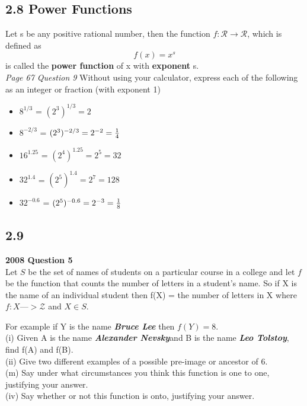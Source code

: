 \documentclass[12 pt]{article}
\begin{document}
\newpage
\subsection*{2.8 Power Functions}
Let s be any positive rational number, then the function $f: \mathcal{R} \rightarrow \mathcal{R}$, which is defined
as \[ f(x) = x^s\] is called the \textbf{power function} of x with \textbf{exponent} s.\\

\bigskip 
\noindent \emph{Page 67 Question 9}
Without using your calculator, express each of the following as an integer or fraction (with exponent 1)
\begin{itemize}
\item $8^{1/3}$ = $(2^3)^{1/3} = 2$
\item $8^{-2/3}$ = $(2^3)^{-2/3} = 2^{-2} = {1 \over 4}$
\item $16^{1.25}$ = $(2^4)^{1.25}  = 2^5 = 32$ 
\item $32^{1.4}$ = $(2^5)^{1.4} = 2^7 = 128$
\item $32^{-0.6}$ = $(2^5)^{-0.6} = 2^{-3} =  {1 \over 8}$
\end{itemize}
\subsection{2.9}
\textbf{2008 Question 5}\\
Let $S$ be the set of names of students on a particular course in a college and
let $f$ be the function that counts the number of letters in a student’s name. So
if X is the name of an individual student then
f(X) = the number of letters in X where $f : X —> \mathcal{Z}$ and $X \in S$.\\
\bigskip

For example if Y is the name \emph{\textbf{Bruce Lee}} then $f(Y) = 8.$\\

(i) Given A is the name \emph{\textbf{Alexander Nevsky}}and B is the name \emph{\textbf{Leo Tolstoy}},
ﬁnd f(A) and f(B).
\\
(ii) Give two different examples of a possible pre-image or ancestor of 6.
\\
(m) Say under what circumstances you think this function is one to one, justifying your answer.
\\
(iv) Say whether or not this function is onto, justifying your answer. \\
\end{document}
